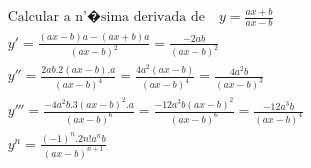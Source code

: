 \begin{ex}
\begin{align}
&\text{Calcular a n'�sima derivada de} \quad y=\frac{ax+b}{ax-b}\nonumber\\
&y'=\frac{(ax-b)a-(ax+b)a}{(ax-b)^2}=\frac{-2ab}{(ax-b)^2}\nonumber\\
&y''=\frac{2ab.2(ax-b).a}{(ax-b)^4}=\frac{4a^2(ax-b)}{(ax-b)^4}=\frac{4a^2b}{(ax-b)^3}\nonumber\\
&y'''=\frac{-4a^2b.3(ax-b)^2.a}{(ax-b)^6}=\frac{-12a^3b(ax-b)^2}{(ax-b)^6}=\frac{-12a^3b}{(ax-b)^4}\nonumber\\
&y^{n}=\frac{(-1)^n.2n!a^{n}b}{(ax-b)^{n+1}}\nonumber
\end{align}
\end{ex}



